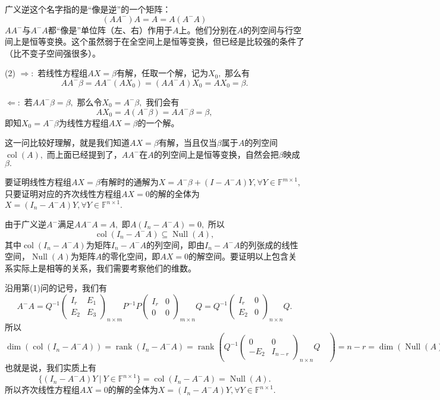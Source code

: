 广义逆这个名字指的是``像是逆''的一个矩阵：
$$(AA^-)A = A = A(A^-A)$$
$AA^-$与$A^-A$都``像是''单位阵（左、右）作用于$A$上。他们分别在$A$的列空间与行空间上是恒等变换。这个虽然弱于在全空间上是恒等变换，但已经是比较强的条件了（比不变子空间强很多）。

\vspace{0.5em}

(2) $\Rightarrow:$ 若线性方程组$AX = \beta$有解，任取一个解，记为$X_0,$ 那么有
$$AA^-\beta = AA^-(AX_0) = (AA^-A)X_0 = AX_0 = \beta.$$

$\Leftarrow:$ 若$AA^-\beta = \beta,$ 那么令$X_0 = A^-\beta,$ 我们会有
$$AX_0 = A(A^-\beta) = AA^-\beta = \beta,$$
即知$X_0 = A^-\beta$为线性方程组$AX = \beta$的一个解。

这一问比较好理解，就是我们知道$AX = \beta$有解，当且仅当$\beta$属于$A$的列空间$\operatorname{col}(A),$ 而上面已经提到了，$AA^-$在$A$的列空间上是恒等变换，自然会把$\beta$映成$\beta.$

要证明线性方程组$AX = \beta$有解时的通解为$X = A^-\beta + (I - A^-A)Y, \forall Y \in \mathbb{F}^{m\times 1},$ 只要证明对应的齐次线性方程组$AX = 0$的解的全体为$X = (I_n - A^-A)Y, \forall Y \in \mathbb{F}^{n\times 1}.$

由于广义逆$A^-$满足$AA^-A = A,$ 即$A(I_n - A^-A) = 0,$ 所以
$$\operatorname{col}(I_n - A^-A) \subseteq \operatorname{Null} (A),$$
其中$\operatorname{col}(I_n - A^-A)$为矩阵$I_n - A^-A$的列空间，即由$I_n - A^-A$的列张成的线性空间，$\operatorname{Null} (A)$为矩阵$A$的零化空间，即$AX = 0$的解空间。要证明以上包含关系实际上是相等的关系，我们需要考察他们的维数。

沿用第(1)问的记号，我们有
$$A^-A = Q^{-1} \begin{pmatrix} I_r & E_1 \\ E_2 & E_3 \end{pmatrix}_{n\times m}\!\!\!\!\!\!\!\!\!\!\! P^{-1} P \begin{pmatrix} I_r & 0 \\ 0 & 0 \end{pmatrix}_{m\times n}\!\!\!\!\!\!\!\!\!\!\! Q = Q^{-1} \begin{pmatrix} I_r & 0 \\ E_2 & 0 \end{pmatrix}_{n\times n}\!\!\!\!\!\!\!\!\!\! Q.$$
所以
$$\dim \left( \operatorname{col}(I_n - A^-A) \right) = \operatorname{rank} (I_n - A^-A) = \operatorname{rank} \left( Q^{-1} \begin{pmatrix} 0 & 0 \\ -E_2 & I_{n-r} \end{pmatrix}_{n\times n}\!\!\!\!\!\!\!\!\!\! Q \hspace{1em} \right) = n - r = \dim \left( \operatorname{Null} (A) \right).$$
也就是说，我们实质上有$$\{ (I_n - A^-A)Y ~|~ Y \in \mathbb{F}^{n\times 1} \} = \operatorname{col}(I_n - A^-A) = \operatorname{Null} (A).$$
所以齐次线性方程组$AX = 0$的解的全体为$X = (I_n - A^-A)Y, \forall Y \in \mathbb{F}^{n\times 1}.$

